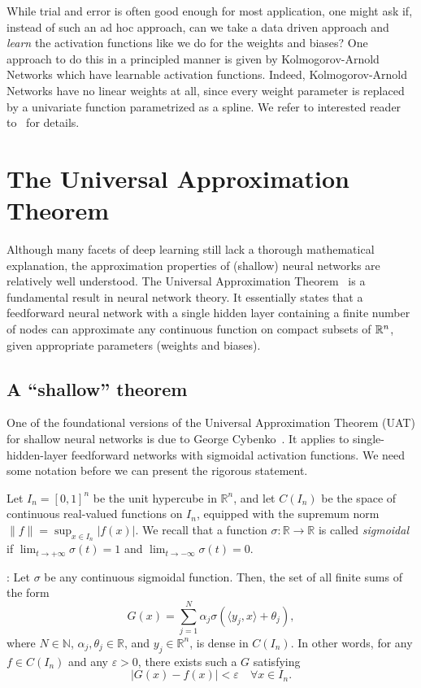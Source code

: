 While trial and error is often good enough for most application, one might ask if, instead of such an ad hoc approach, can we take a data driven approach and {\em learn} the activation functions like we do for the weights and biases?
One approach to do this in a principled manner is given by Kolmogorov-Arnold Networks which have learnable activation functions. Indeed, Kolmogorov-Arnold Networks have no linear weights at all, since every weight parameter is replaced by a univariate function parametrized as a spline.
We refer to interested reader to~\cite{liu2024kan} for details.

\section{The Universal Approximation Theorem}


Although many facets of deep learning still lack a thorough mathematical explanation, the approximation properties of (shallow) neural networks are relatively well understood.
The Universal Approximation Theorem~\cite{hornik1990universal,hornik1991approximation,cybenko1989approximation,pinkus1999approximation,barron2002universal}
is a fundamental result in neural network theory. It essentially states that a feedforward neural network with a single hidden layer containing a finite number of nodes can approximate any continuous function on compact subsets of $\mathbb{R}^n$, given appropriate parameters (weights and biases).

\subsection{A ``shallow'' theorem}

One of the foundational versions of the Universal Approximation Theorem (UAT) for shallow neural networks is due to George Cybenko~\cite{cybenko1989approximation}. It applies to single-hidden-layer feedforward networks with sigmoidal activation functions. We need some notation before we can present the rigorous statement.

Let \( I_n = [0,1]^n \) be the unit hypercube in \( \mathbb{R}^n \), and let \( C(I_n) \) be the space of continuous real-valued functions on \( I_n \), equipped with the supremum norm \( \|f\| = \sup_{x \in I_n} |f(x)| \).
We recall that a function \( \sigma: \mathbb{R} \to \mathbb{R} \) is called {\em sigmoidal} if \( \lim_{t \to +\infty} \sigma(t) = 1 \) and \( \lim_{t \to -\infty} \sigma(t) = 0 \).

\begin{theorem}[Cybenko, 1989]: \label{th:UAT} Let \( \sigma \) be any continuous sigmoidal function. Then, the set of all finite sums of the form
\[
G(x) = \sum_{j=1}^N \alpha_j \sigma(\langle y_j, x\rangle + \theta_j),
\]
where \( N \in \mathbb{N} \), \( \alpha_j, \theta_j \in \mathbb{R} \), and \( y_j \in \mathbb{R}^n \), is dense in \( C(I_n) \). In other words, for any \( f \in C(I_n) \) and any \( \varepsilon > 0 \), there exists such a \( G \) satisfying
\[
|G(x) - f(x)| < \varepsilon \quad \forall x \in I_n.
\]
\end{theorem}

